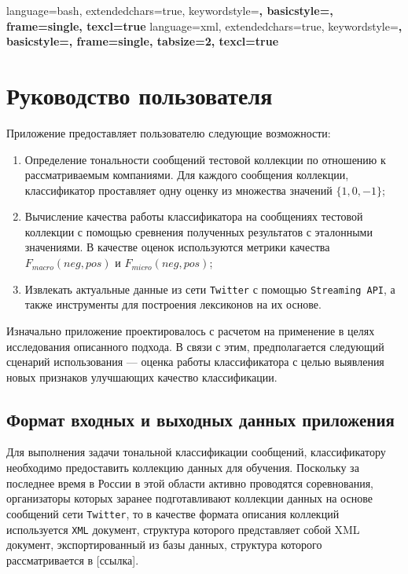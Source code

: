 {
    language=bash,
    extendedchars=true,
    keywordstyle=\bfseries,
    basicstyle=\footnotesize,
    frame=single,
    texcl=true
}
{
    language=xml,
    extendedchars=true,
    keywordstyle=\bfseries,
    basicstyle=\footnotesize,
    frame=single,
    tabsize=2,
    texcl=true
}


\section{Руководство пользователя}
Приложение предоставляет пользователю следующие возможности:
\begin{enumerate}
    \item Определение тональности сообщений тестовой коллекции по отношению к
    рассматриваемым компаниями. Для каждого сообщения коллекции, классификатор
    проставляет одну оценку из множества значений $\{1, 0, -1\}$;
    \item Вычисление качества работы классификатора на сообщениях тестовой
    коллекции с помощью сревнения полученных результатов с эталонными значениями.
    В качестве оценок используются метрики качества $F_{macro}(neg, pos)$ и
    $F_{micro}(neg, pos)$;
    \item Извлекать актуальные данные из сети {\tt Twitter} с помощью
    {\tt Streaming API}, а также инструменты для построения лексиконов на их
    основе.
\end{enumerate}

Изначально приложение проектировалось с расчетом на применение в целях
исследования описанного подхода. В связи с этим, предполагается следующий
сценарий использования --- оценка работы классификатора с целью выявления новых
признаков улучшающих качество классификации.
    \subsection{Формат входных и выходных данных приложения}
    Для выполнения задачи тональной классификации сообщений, классификатору
    необходимо предоставить коллекцию данных для обучения. Поскольку за последнее
    время в России в этой области активно проводятся соревнования, организаторы
    которых заранее подготавливают коллекции данных на основе сообщений сети
    {\tt Twitter}, то в качестве формата описания коллекций используется
    {\tt XML} документ, структура которого представляет собой XML документ,
    экспортированный из базы данных, структура которого рассматривается в
    [ссылка].

